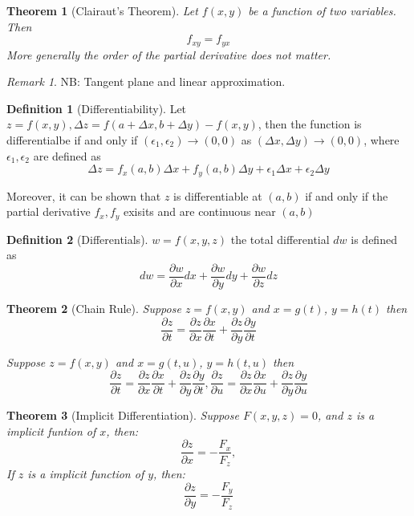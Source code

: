 \documentclass[12pt,a4paper]{article}
\newtheorem{theorem}{Theorem}[subsection]
\theoremstyle{definition}
\newtheorem{definition}{Definition}[section]
\theoremstyle{remark}
\newtheorem{remark}{Remark}[section]
\begin{document}
\begin{theorem}[Clairaut's Theorem]

	Let $ f(x,y) $ be a function of two variables. Then
	\[
		f_{xy}=f_{yx}
	\]
More generally the order of the partial derivative does not matter.
\end{theorem}

\begin{remark}
	NB: Tangent plane and linear approximation.
	
\end{remark}

\begin{definition}[Differentiability]
	Let $z = f(x,y), \Delta z = f(a+\Delta x,b+\Delta y) - f(x,y) $, then the function is differentialbe if and only if $(\epsilon _1, \epsilon _2) \to (0, 0)$ as  $(\Delta x, \Delta y) \to (0, 0)$, where $ \epsilon _1, \epsilon _2 $ are defined as 
	\[
\Delta z = f_x(a,b) \Delta x + f_y(a,b) \Delta y + \epsilon _1 \Delta x + \epsilon _2 \Delta y
	\]

Moreover, it can be shown that $z$ is differentiable at $(a,b)$ if and only if the partial derivative $f_x, f_y$ exisits and are continuous near $(a,b)$
\end{definition}

\begin{definition}[Differentials]
	$w = f(x,y,z)$ the total differential $dw$ is defined as 
	\[
dw = \frac{\partial w}{\partial x} dx + \frac{\partial w}{\partial y} dy + \frac{\partial w}{\partial z} d z
	\]
	
\end{definition}

\begin{theorem}[Chain Rule]
Suppose $z = f(x, y)$ and $ x = g(t)$, $y = h(t)$ then 
\[
\frac{\partial z}{\partial t} = \frac{\partial z}{\partial x} \frac{\partial x}{\partial t} + \frac{\partial z}{\partial y} \frac{\partial y}{\partial t}
\]

Suppose $z = f(x, y)$ and $ x = g(t, u)$, $y = h(t, u)$ then
\[
\frac{\partial z}{\partial t} = \frac{\partial z}{\partial x} \frac{\partial x}{\partial t} + \frac{\partial z}{\partial y} \frac{\partial y}{\partial t}, 
\frac{\partial z}{\partial u}
= \frac{\partial z}{\partial x} \frac{\partial x}{\partial u} + \frac{\partial z}{\partial y} \frac{\partial y}{\partial u}
\]

\end{theorem}

\begin{theorem}[Implicit Differentiation]
	Suppose $F(x,y,z) = 0$, and $z$ is a implicit funtion of $x$, then:
	\[
		\frac{\partial z}{\partial x} = - \frac{F_x}{F_z}, 
	\]
If $z$ is a implicit function of $y$, then:
\[
		\frac{\partial z}{\partial y} = - \frac{F_y}{F_z}
	\]
\end{theorem}
\end{document}
